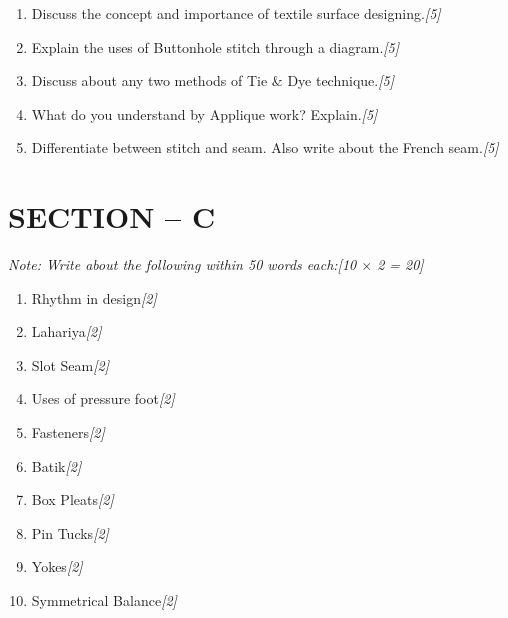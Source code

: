 \documentclass[11pt,a4paper]{article}
\newcommand{\pts}[1]{\hfill \textit{[#1]}}
\begin{document}
\begin{enumerate}[label=\textbf{\arabic*.},leftmargin=*,start=5,itemsep=8pt]

  \item Discuss the concept and importance of textile surface designing.\pts{5}

  \item Explain the uses of Buttonhole stitch through a diagram.\pts{5}

  \item Discuss about any two methods of Tie \& Dye technique.\pts{5}

  \item What do you understand by Applique work? Explain.\pts{5}

  \item Differentiate between stitch and seam. Also write about the French seam.\pts{5}

\end{enumerate}

\bigskip

\section*{SECTION -- C}
\noindent \textit{Note: Write about the following within 50 words each:}\pts{10 $\times$ 2 = 20}

\begin{enumerate}[label=\textbf{10.}(\roman*),leftmargin=*,itemsep=6pt]

  \item Rhythm in design\pts{2}
  \item Lahariya\pts{2}
  \item Slot Seam\pts{2}
  \item Uses of pressure foot\pts{2}
  \item Fasteners\pts{2}
  \item Batik\pts{2}
  \item Box Pleats\pts{2}
  \item Pin Tucks\pts{2}
  \item Yokes\pts{2}
  \item Symmetrical Balance\pts{2}

\end{enumerate}
\end{document}
